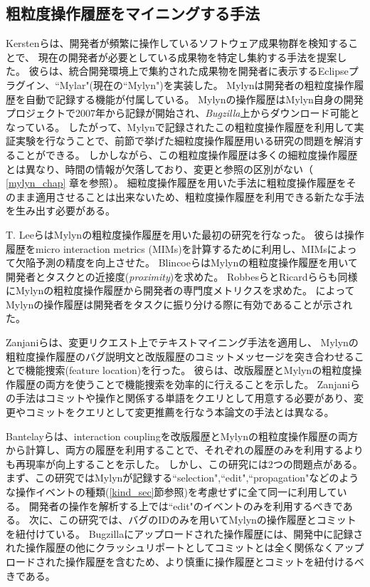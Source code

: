 \documentclass[a4paper]{jsbook}
\begin{document}
\subsection{粗粒度操作履歴をマイニングする手法}\label{coarse_sec}
Kerstenらは、開発者が頻繁に操作しているソフトウェア成果物群を検知することで、
現在の開発者が必要としている成果物を特定し集約する手法を提案した。
彼らは、統合開発環境上で集約された成果物を開発者に表示するEclipseプラグイン、``Mylar"(現在の``Mylyn")\cite{Kersten:2005}を実装した。
Mylynは開発者の粗粒度操作履歴を自動で記録する機能が付属している。
Mylynの操作履歴はMylyn自身の開発プロジェクトで2007年から記録が開始され、{\it Bugzilla}上からダウンロード可能となっている。
したがって、Mylynで記録されたこの粗粒度操作履歴を利用して実証実験を行なうことで、前節で挙げた細粒度操作履歴用いる研究の問題を解消することができる。
しかしながら、この粗粒度操作履歴は多くの細粒度操作履歴とは異なり、時間の情報が欠落しており、変更と参照の区別がない（ \ref{mylyn_chap} 章を参照）。
細粒度操作履歴を用いた手法に粗粒度操作履歴をそのまま適用させることは出来ないため、粗粒度操作履歴を利用できる新たな手法を生み出す必要がある。

T. Leeら\cite{TLee:2011}はMylynの粗粒度操作履歴を用いた最初の研究を行なった。
彼らは操作履歴をmicro interaction metrics (MIMs)を計算するために利用し、MIMsによって欠陥予測の精度を向上させた。
Blincoeら\cite{Blincoe:2012}はMylynの粗粒度操作履歴を用いて開発者とタスクとの近接度({\it proximity})を求めた。
Robbesら\cite{Robbes:2013}とRicardら\cite{Silva:2015}らも同様にMylynの粗粒度操作履歴から開発者の専門度メトリクスを求めた。
\cite{Blincoe:2012,Robbes:2013,Silva:2015}によってMylynの操作履歴は開発者をタスクに振り分ける際に有効であることが示された。

Zanjaniら\cite{Zanjani:2014}は、変更リクエスト上でテキストマイニング手法を適用し、
Mylynの粗粒度操作履歴のバグ説明文と改版履歴のコミットメッセージを突き合わせることで機能捜索(feature location)を行った。
彼らは、改版履歴とMylynの粗粒度操作履歴の両方を使うことで機能捜索を効率的に行えることを示した。
Zanjaniらの手法はコミットや操作と関係する単語をクエリとして用意する必要があり、変更やコミットをクエリとして変更推薦を行なう本論文の手法とは異なる。

Bantelayら\cite{Bantelay:2013}は、interaction couplingを改版履歴とMylynの粗粒度操作履歴の両方から計算し、両方の履歴を利用することで、それぞれの履歴のみを利用するよりも再現率が向上することを示した。
しかし、この研究には2つの問題点がある。
まず、この研究ではMylynが記録する``selection",``edit",``propagation"などのような操作イベントの種類(\ref{kind_sec}節参照)を考慮せずに全て同一に利用している。
開発者の操作を解析する上では``edit"のイベントのみを利用するべきである。
次に、この研究では、バグのIDのみを用いてMylynの操作履歴とコミットを紐付けている。
Bugzillaにアップロードされた操作履歴には、開発中に記録された操作履歴の他にクラッシュリポートとしてコミットとは全く関係なくアップロードされた操作履歴を含むため、より慎重に操作履歴とコミットを紐付けるべきである。
\end{document}
